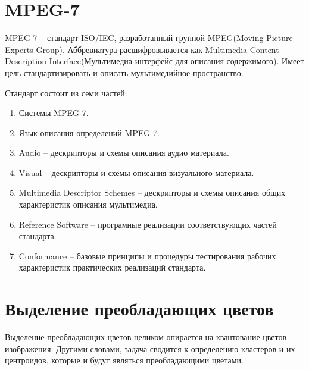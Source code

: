 \begin{figure}[ht!]
\end{figure}

\section{ MPEG-7}
MPEG-7 -- стандарт ISO/IEC, разработанный группой MPEG(Moving Picture Experts Group). Аббревиатура расшифровывается как Multimedia Content Description Interface(Мультимедиа-интерфейс для описания содержимого). Имеет цель стандартизировать и описать мультимедийное пространство.

Стандарт состоит из семи частей:
\begin{enumerate}
	\item Системы MPEG-7.
	\item Язык описания определений MPEG-7.
	\item Audio -- дескрипторы и схемы описания аудио материала.
	\item Visual -- дескрипторы и схемы описания визуального материала.
	\item Multimedia Descriptor Schemes -- дескрипторы и схемы описания общих характеристик описания мультимедиа.
	\item Reference Software -- програмные реализации соответствующих частей стандарта.
	\item Conformance -- базовые принципы и процедуры тестирования рабочих характеристик практических реализаций стандарта.
\end{enumerate}

\section{ Выделение преобладающих цветов}
Выделение преобладающих цветов целиком опирается на квантование цветов изображения. Другими словами, задача сводится к определению кластеров и их центроидов, которые и будут являться преобладающими цветами.
